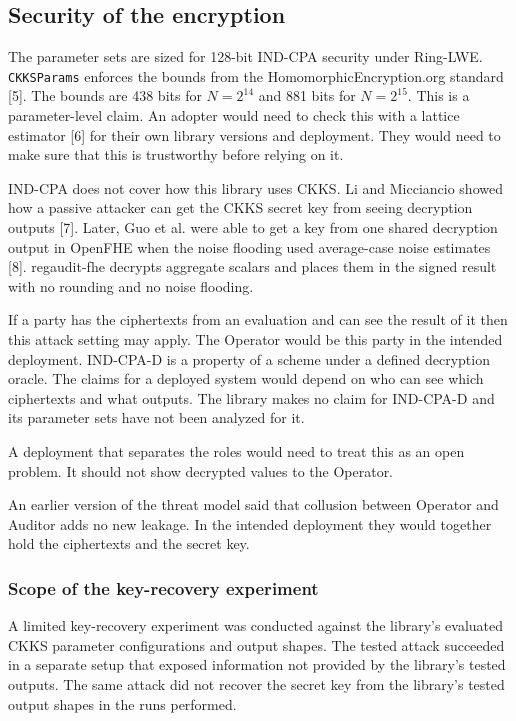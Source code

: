 \documentclass[10pt,a4paper]{article}
\begin{document}
\subsection{Security of the encryption}

The parameter sets are sized for 128-bit IND-CPA security under Ring-LWE. \texttt{CKKSParams} enforces the bounds from the HomomorphicEncryption.org standard [5]. The bounds are 438 bits for $N=2^{14}$ and 881 bits for $N=2^{15}$. This is a parameter-level claim. An adopter would need to check this with a lattice estimator [6] for their own library versions and deployment. They would need to make sure that this is trustworthy before relying on it.

IND-CPA does not cover how this library uses CKKS. Li and Micciancio showed how a passive attacker can get the CKKS secret key from seeing decryption outputs [7]. Later, Guo et al. were able to get a key from one shared decryption output in OpenFHE when the noise flooding used average-case noise estimates [8]. regaudit-fhe decrypts aggregate scalars and places them in the signed result with no rounding and no noise flooding.

If a party has the ciphertexts from an evaluation and can see the result of it then this attack setting may apply. The Operator would be this party in the intended deployment. IND-CPA-D is a property of a scheme under a defined decryption oracle. The claims for a deployed system would depend on who can see which ciphertexts and what outputs. The library makes no claim for IND-CPA-D and its parameter sets have not been analyzed for it.

A deployment that separates the roles would need to treat this as an open problem. It should not show decrypted values to the Operator.

An earlier version of the threat model said that collusion between Operator and Auditor adds no new leakage. In the intended deployment they would together hold the ciphertexts and the secret key.

\subsubsection*{Scope of the key-recovery experiment}

A limited key-recovery experiment was conducted against the library's evaluated CKKS parameter configurations and output shapes. The tested attack succeeded in a separate setup that exposed information not provided by the library's tested outputs. The same attack did not recover the secret key from the library's tested output shapes in the runs performed.
\end{document}
